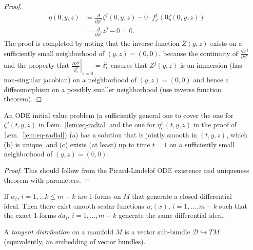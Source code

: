 \begin{proof}
\begin{align*}
  \eta(0,y,z)
  &= \frac{\partial}{\partial y^{i'}} \zeta^j(0,y,z) - 0 \cdot f_{i'}^j(0 \zeta(0,y,z))
  \\
  &= \frac{\partial}{\partial y^{i'}} z^j - 0 = 0 .
\end{align*}
The proof is completed by noting that the inverse function $\bar{Z}(y,z)$ exists
on a sufficiently small neighborhood of $(y,z)=(0,0)$, because the continuity of
$\frac{\partial Z^j}{\partial z^k}$ and the property that $\left.\frac{\partial
Z^j}{\partial_z^k}\right|_{z=0} = \delta^j_k$ ensures that $Z^j(y,z)$ is an
immersion (has non-singular jacobian) on a neighborhood of $(y,z)=(0,0)$ and
hence a diffeomorphism on a possibly smaller neighborhood (use inverse function
theorem).
\end{proof}

\begin{lemma} \label{lem:eq-radial-exists}
An ODE initial value problem (a sufficiently general one to cover the one for
$\zeta^j(t,y,z)$ in Lem.~\ref{lem:eq-radial} and the one for
$\eta_{i'}^j(t,y,z)$ in the proof of Lem.~\ref{lem:eq-radial}) (a) has a
solution that is jointly smooth in $(t,y,z)$, which (b) is unique, and (c)
exists (at least) up to time $t=1$ on a sufficiently small neighborhood of
$(y,z) = (0,0)$.
\end{lemma}
\begin{proof}
This should follow from the Picard-Lindel\"of ODE existence and uniqueness
theorem with parameters.
\end{proof}

\begin{definition} \label{def:forms}
\notready
\end{definition}

\begin{definition} \label{def:diff-ideal}
\notready
\end{definition}

\begin{theorem} \label{thm:frob-forms}
If $\alpha_i$, $i=1,\ldots k\le m-k$ are 1-forms on $M$ that generate a closed
differential ideal. Then there exist smooth scalar functions $u_i(x)$,
$i=1,\ldots,m-k$ such that the exact 1-forms $du_i$, $i=1,\ldots,m-k$ generate
the same differential ideal.
\end{theorem}

\begin{definition} \label{def:vec-dist}
A \emph{tangent distribution} on a manifold $M$ is a vector sub-bundle
$\mathcal{D}\hookrightarrow TM$ (equivalently, an embedding of vector bundles).
\end{definition}

